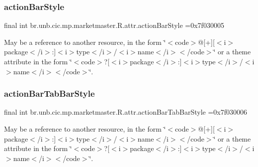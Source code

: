 \subsubsection{\texorpdfstring{action\+Bar\+Style}{actionBarStyle}}
{\footnotesize\ttfamily final int br.\+unb.\+cic.\+mp.\+marketmaster.\+R.\+attr.\+action\+Bar\+Style =0x7f030005\hspace{0.3cm}{\ttfamily [static]}}

May be a reference to another resource, in the form \char`\"{}$<$code$>$@\mbox{[}+\mbox{]}\mbox{[}$<$i$>$package$<$/i$>$\+:\mbox{]}$<$i$>$type$<$/i$>$/$<$i$>$name$<$/i$>$$<$/code$>$\char`\"{} or a theme attribute in the form \char`\"{}$<$code$>$?\mbox{[}$<$i$>$package$<$/i$>$\+:\mbox{]}$<$i$>$type$<$/i$>$/$<$i$>$name$<$/i$>$$<$/code$>$\char`\"{}. \mbox{\label{classbr_1_1unb_1_1cic_1_1mp_1_1marketmaster_1_1R_1_1attr_a03c075a99608f676f8cae2c9d810d969}} 
\subsubsection{\texorpdfstring{action\+Bar\+Tab\+Bar\+Style}{actionBarTabBarStyle}}
{\footnotesize\ttfamily final int br.\+unb.\+cic.\+mp.\+marketmaster.\+R.\+attr.\+action\+Bar\+Tab\+Bar\+Style =0x7f030006\hspace{0.3cm}{\ttfamily [static]}}

May be a reference to another resource, in the form \char`\"{}$<$code$>$@\mbox{[}+\mbox{]}\mbox{[}$<$i$>$package$<$/i$>$\+:\mbox{]}$<$i$>$type$<$/i$>$/$<$i$>$name$<$/i$>$$<$/code$>$\char`\"{} or a theme attribute in the form \char`\"{}$<$code$>$?\mbox{[}$<$i$>$package$<$/i$>$\+:\mbox{]}$<$i$>$type$<$/i$>$/$<$i$>$name$<$/i$>$$<$/code$>$\char`\"{}. \mbox{\label{classbr_1_1unb_1_1cic_1_1mp_1_1marketmaster_1_1R_1_1attr_a3b40e421a07247fa5fe6320090923bc7}} 
